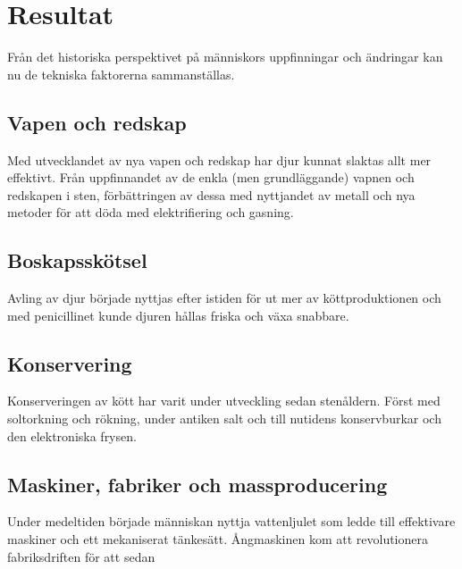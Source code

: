 \section{Resultat}
Från det historiska perspektivet på människors uppfinningar och ändringar kan nu de tekniska faktorerna sammanställas. 

\subsection{Vapen och redskap}
Med utvecklandet av nya vapen och redskap har djur kunnat slaktas allt mer effektivt. Från uppfinnandet av de enkla (men grundläggande) vapnen och redskapen i sten, förbättringen av dessa med nyttjandet av metall och nya metoder för att döda med elektrifiering och gasning.

\subsection{Boskapsskötsel}
Avling av djur började nyttjas efter istiden för ut mer av köttproduktionen och med penicillinet kunde djuren hållas friska och växa snabbare.  

\subsection{Konservering}
Konserveringen av kött har varit under utveckling sedan stenåldern. Först med soltorkning och rökning, under antiken salt och till nutidens konservburkar och den elektroniska frysen.   

\subsection{Maskiner, fabriker och massproducering}
Under medeltiden började människan nyttja vattenljulet som ledde till effektivare maskiner och ett mekaniserat tänkesätt. Ångmaskinen kom att revolutionera fabriksdriften för att sedan   


